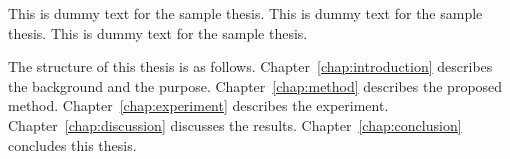 
This is dummy text for the sample thesis.
This is dummy text for the sample thesis.
This is dummy text for the sample thesis.

The structure of this thesis is as follows.
Chapter~\ref{chap:introduction} describes the background and the purpose.
Chapter~\ref{chap:method} describes the proposed method.
Chapter~\ref{chap:experiment} describes the experiment.
Chapter~\ref{chap:discussion} discusses the results.
Chapter~\ref{chap:conclusion} concludes this thesis.
